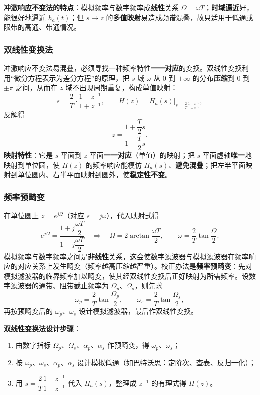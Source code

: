 \textbf{冲激响应不变法的特点}：模拟频率与数字频率成\textbf{线性}关系 $\Omega=\omega T$；\textbf{时域逼近}好，能很好地逼近 $h_a(t)$；但 $s\to z$ 的\textbf{多值映射}易造成频谱混叠，故只适用于低通或限带的高通、带通情况。

\subsubsection{双线性变换法}
冲激响应不变法易混叠，必须寻找一种频率特性\textbf{一一对应}的变换。双线性变换利用“微分方程表示为差分方程”的原理，把 $s$ 域 $\omega$ 从 $0$ 到 $\pm\infty$ 的分布\textbf{压缩}到 $0$ 到 $\pm\pi$ 之间，从而在 $z$ 域不出现周期重复，构成单值映射：
\begin{equation}
s=\frac{2}{T}\cdot\frac{1-z^{-1}}{1+z^{-1}},\qquad
H(z)=H_a(s)\Big|_{s=\frac{2}{T}\frac{1-z^{-1}}{1+z^{-1}}},
\end{equation}
反解得
\begin{equation}
z=\frac{1+\dfrac{T}{2}s}{1-\dfrac{T}{2}s}.
\end{equation}
\textbf{映射特性}：它是 $s$ 平面到 $z$ 平面\textbf{一一对应}（单值）的映射；把 $s$ 平面虚轴\textbf{唯一}地映射到单位圆，使 $H(z)$ 的频率响应能模仿 $H_a(s)$、\textbf{避免混叠}；把左半平面映射到单位圆内、右半平面映射到圆外，使\textbf{稳定性不变}。

\subsubsection{频率预畸变}
在单位圆上 $z=e^{j\Omega}$（对应 $s=j\omega$），代入映射式得
\begin{equation}
e^{j\Omega}=\frac{1+j\dfrac{\omega T}{2}}{1-j\dfrac{\omega T}{2}}
\quad\Longrightarrow\quad
\Omega=2\arctan\frac{\omega T}{2},\qquad
\omega=\frac{2}{T}\tan\frac{\Omega}{2}.
\end{equation}
模拟频率与数字频率之间是\textbf{非线性}关系，这会使数字滤波器与模拟滤波器在频率响应的对应关系上发生畸变（频率越高压缩越严重）。校正办法是\textbf{频率预畸变}：先对模拟滤波器的临界频率加以畸变，使其经双线性变换后正好映射为所需频率。设数字滤波器的通带、阻带截止频率为 $\Omega_p$、$\Omega_s$，则先求
\begin{equation}
\omega_p=\frac{2}{T}\tan\frac{\Omega_p}{2},\qquad
\omega_s=\frac{2}{T}\tan\frac{\Omega_s}{2},
\end{equation}
再按预畸变后的 $\omega_p$、$\omega_s$ 设计模拟滤波器，最后作双线性变换。

\textbf{双线性变换法设计步骤}：
\begin{enumerate}
\item 由数字指标 $\Omega_p$、$\Omega_s$、$\alpha_p$、$\alpha_s$ 作预畸变，得 $\omega_p$、$\omega_s$；
\item 按 $\omega_p$、$\omega_s$、$\alpha_p$、$\alpha_s$ 设计模拟低通（如巴特沃思：定阶次、查表、反归一化）；
\item 用 $s=\dfrac{2}{T}\dfrac{1-z^{-1}}{1+z^{-1}}$ 代入 $H_a(s)$，整理成 $z^{-1}$ 的有理式得 $H(z)$。
\end{enumerate}

